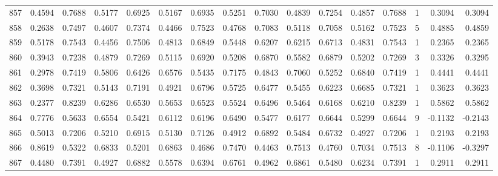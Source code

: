 \begin{tabular}{lrrrrrrrrrrrrrrr}
857 &      0.4594 &  0.7688 &  0.5177 &  0.6925 &  0.5167 &  0.6935 &  0.5251 &  0.7030 &  0.4839 &  0.7254 &   0.4857 &     0.7688 &      1 &                    0.3094 &                     0.3094 \\
858 &      0.2638 &  0.7497 &  0.4607 &  0.7374 &  0.4466 &  0.7523 &  0.4768 &  0.7083 &  0.5118 &  0.7058 &   0.5162 &     0.7523 &      5 &                    0.4885 &                     0.4859 \\
859 &      0.5178 &  0.7543 &  0.4456 &  0.7506 &  0.4813 &  0.6849 &  0.5448 &  0.6207 &  0.6215 &  0.6713 &   0.4831 &     0.7543 &      1 &                    0.2365 &                     0.2365 \\
860 &      0.3943 &  0.7238 &  0.4879 &  0.7269 &  0.5115 &  0.6920 &  0.5208 &  0.6870 &  0.5582 &  0.6879 &   0.5202 &     0.7269 &      3 &                    0.3326 &                     0.3295 \\
861 &      0.2978 &  0.7419 &  0.5806 &  0.6426 &  0.6576 &  0.5435 &  0.7175 &  0.4843 &  0.7060 &  0.5252 &   0.6840 &     0.7419 &      1 &                    0.4441 &                     0.4441 \\
862 &      0.3698 &  0.7321 &  0.5143 &  0.7191 &  0.4921 &  0.6796 &  0.5725 &  0.6477 &  0.5455 &  0.6223 &   0.6685 &     0.7321 &      1 &                    0.3623 &                     0.3623 \\
863 &      0.2377 &  0.8239 &  0.6286 &  0.6530 &  0.5653 &  0.6523 &  0.5524 &  0.6496 &  0.5464 &  0.6168 &   0.6210 &     0.8239 &      1 &                    0.5862 &                     0.5862 \\
864 &      0.7776 &  0.5633 &  0.6554 &  0.5421 &  0.6112 &  0.6196 &  0.6490 &  0.5477 &  0.6177 &  0.6644 &   0.5299 &     0.6644 &      9 &                   -0.1132 &                    -0.2143 \\
865 &      0.5013 &  0.7206 &  0.5210 &  0.6915 &  0.5130 &  0.7126 &  0.4912 &  0.6892 &  0.5484 &  0.6732 &   0.4927 &     0.7206 &      1 &                    0.2193 &                     0.2193 \\
866 &      0.8619 &  0.5322 &  0.6833 &  0.5201 &  0.6863 &  0.4686 &  0.7470 &  0.4463 &  0.7513 &  0.4760 &   0.7034 &     0.7513 &      8 &                   -0.1106 &                    -0.3297 \\
867 &      0.4480 &  0.7391 &  0.4927 &  0.6882 &  0.5578 &  0.6394 &  0.6761 &  0.4962 &  0.6861 &  0.5480 &   0.6234 &     0.7391 &      1 &                    0.2911 &                     0.2911 \\

\end{tabular}
